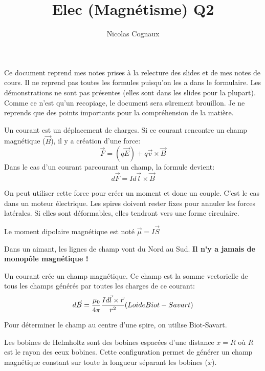 \documentclass[11pt,a4paper]{article} %
\title{Elec (Magnétisme) Q2}
\author{Nicolas Cognaux}
\begin{document}
\maketitle
Ce document reprend mes notes prises à la relecture des slides et de mes notes de cours. Il ne reprend pas toutes les formules puisqu'on les a dans le formulaire. Les démonstrations ne sont pas présentes (elles sont dans les slides pour la plupart). 
Comme ce n'est qu'un recopiage, le document sera sûrement brouillon. Je ne reprends que des points importants pour la compréhension de la matière.



Un courant est un déplacement de charges. Si ce courant rencontre un champ magnétique ($\vec B$), il y a création d'une force:
$$ \vec F = (q \vec E) + q \vec v \times \vec B $$
Dans le cas d'un courant parcourant un champ, la formule devient:
$$ d\vec F = Id\vec l \times \vec B $$

On peut utiliser cette force pour créer un moment et donc un couple. C'est le cas dans un moteur électrique. Les spires doivent rester fixes pour annuler les forces latérales. Si elles sont déformables, elles tendront vers une forme circulaire.

Le moment dipolaire magnétique est noté $\vec \mu = I \vec S$

Dans un aimant, les lignes de champ vont du Nord au Sud. { \bf Il n'y a jamais de monopôle magnétique !}

Un courant crée un champ magnétique. Ce champ est la somme vectorielle de tous les champs générés par toutes les charges de ce courant:
$$ d\vec B = \frac{\mu_0}{4\pi}\frac{Id\vec l\times \vec r}{r^2} \textrm(Loi de Biot-Savart)$$

Pour déterminer le champ au centre d'une spire, on utilise Biot-Savart.

Les bobines de Helmholtz sont des bobines espacées d'une distance $x = R$ où $R$ est le rayon des eeux bobines. Cette configuration permet de générer un champ magnétique constant sur toute la longueur séparant les bobines ($x$).
\end{document}
